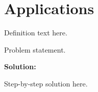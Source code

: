 \section{Applications}


\begin{definition}[Term]
Definition text here.
\end{definition}

\begin{example}
Problem statement.

\textbf{Solution:}

Step-by-step solution here.
\end{example}
